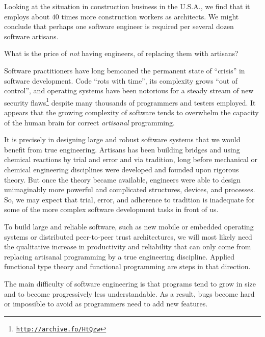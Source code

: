Looking at the situation in construction business in the U.S.A., we
find that it employs about $40$ times more construction workers as
architects. We might conclude that perhaps one software engineer is
required per several dozen software artisans.

What is the price of \emph{not} having engineers, of replacing them
with artisans?

Software practitioners have long bemoaned the permanent state of \textsf{``}crisis\textsf{''}
in software development. Code \textsf{``}rots with time\textsf{''}, its complexity
grows \textsf{``}out of control\textsf{''}, and operating systems have been notorious
for a steady stream of new security flaws\footnote{\texttt{\href{http://archive.fo/HtQzw}{http://archive.fo/HtQzw}}}
despite many thousands of programmers and testers employed. It appears
that the growing complexity of software tends to overwhelm the capacity
of the human brain for correct \emph{artisanal} programming.

It is precisely in designing large and robust software systems that
we would benefit from true engineering. Artisans has been building
bridges and using chemical reactions by trial and error and via tradition,
long before mechanical or chemical engineering disciplines were developed
and founded upon rigorous theory. But once the theory became available,
engineers were able to design unimaginably more powerful and complicated
structures, devices, and processes. So, we may expect that trial,
error, and adherence to tradition is inadequate for some of the more
complex software development tasks in front of us. 

To build large and reliable software, such as new mobile or embedded
operating systems or distributed peer-to-peer trust architectures,
we will most likely need the qualitative increase in productivity
and reliability that can only come from replacing artisanal programming
by a true engineering discipline. Applied functional type theory and
functional programming are steps in that direction.


The main difficulty of software engineering is that programs tend
to grow in size and to become progressively less understandable. As
a result, bugs become hard or impossible to avoid as programmers need
to add new features. 

